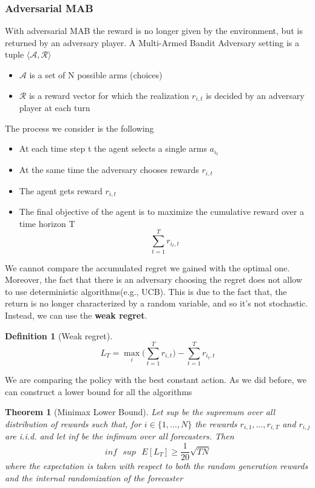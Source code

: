 \documentclass[main.tex]{subfiles}
\newtheorem{theorem}{Theorem}[section]
\newtheorem{definition}{Definition}[section]
\begin{document}
\subsubsection{Adversarial MAB}
With adversarial MAB the reward is no longer given by the environment, but is returned by an adversary player. A Multi-Armed Bandit Adversary setting is a tuple $\langle \mathcal{A}, \mathcal{R} \rangle$
\begin{itemize}
    \item $\mathcal{A}$ is a set of N possible arms (choices)
    \item $\mathcal{R}$ is a reward vector for which the realization $r_{i,t}$ is decided by an adversary player at each turn
\end{itemize}
The process we consider is the following
\begin{itemize}
    \item At each time step t the agent selects a single arms $a_{i_t}$
    \item At the same time the adversary chooses rewards $r_{i,t}$
    \item The agent gets reward $r_{i,t}$
    \item The final objective of the agent is to maximize the cumulative reward over a time horizon T
    \begin{equation*}
        \sum_{t=1}^T r_{i_t,t}
    \end{equation*}
\end{itemize}
We cannot compare the accumulated regret we gained with the optimal one. Moreover, the fact that there is an adversary choosing the regret does not allow to use deterministic algorithms(e.g., UCB). This is due to the fact that, the return is no longer characterized by a random variable, and so it's not stochastic. Instead, we can use the \textbf{weak regret}.
\begin{definition}[Weak regret]
\begin{equation*}
    L_T = \max_i \bigg( \sum_{t=1}^T r_{i,t} \bigg) - \sum_{t=1}^T r_{i_t,t}
\end{equation*}
\end{definition}
We are comparing the policy with the best constant action.
As we did before, we can construct a lower bound for all the algorithms
\begin{theorem}[Minimax Lower Bound]
Let sup be the supremum over all distribution of rewards such that, for $i \in \{ 1, \dots, N \}$ the rewards $r_{i,1}, \dots, r_{i,T}$ and $r_{i,j}$ are i.i.d. and let inf be the infimum over all forecasters. Then
\begin{equation*}
    inf\text{ }sup\text{ }E[L_T] \geq \frac{1}{20}\sqrt{TN}
\end{equation*}
where the expectation is taken with respect to both the random generation rewards and the internal randomization of the forecaster
\end{theorem}
\end{document}
